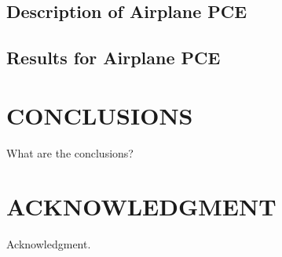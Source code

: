 \documentclass[letterpaper, 10 pt, conference]{ieeeconf}  %
\begin{document}
\subsection{Description of Airplane PCE}

\subsection{Results for Airplane PCE}

\section{CONCLUSIONS}
What are the conclusions?








\section*{ACKNOWLEDGMENT}

Acknowledgment.



\end{document}
